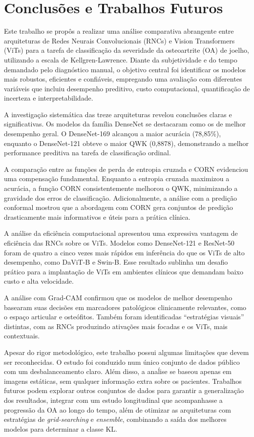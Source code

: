 \chapter{Conclusões e Trabalhos Futuros}\label{cap:conclusao}

Este trabalho se propôs a realizar uma análise comparativa abrangente entre arquiteturas de Redes Neurais Convolucionais (RNCs) e Vision Transformers (ViTs) para a tarefa de classificação da severidade da osteoartrite (OA) de joelho, utilizando a escala de Kellgren-Lawrence. Diante da subjetividade e do tempo demandado pelo diagnóstico manual, o objetivo central foi identificar os modelos mais robustos, eficientes e confiáveis, empregando uma avaliação com diferentes variáveis que incluiu desempenho preditivo, custo computacional, quantificação de incerteza e interpretabilidade.

A investigação sistemática das treze arquiteturas revelou conclusões claras e significativas. Os modelos da família DenseNet se destacaram como os de melhor desempenho geral. O DenseNet-169 alcançou a maior acurácia (78,85\%), enquanto o DenseNet-121 obteve o maior QWK (0,8878), demonstrando a melhor performance preditiva na tarefa de classificação ordinal.

A comparação entre as funções de perda de entropia cruzada e CORN evidenciou uma compensação fundamental. Enquanto a entropia cruzada maximizou a acurácia, a função CORN consistentemente melhorou o QWK, minimizando a gravidade dos erros de classificação. Adicionalmente, a análise com a predição conformal mostrou que a abordagem com CORN gera conjuntos de predição drasticamente mais informativos e úteis para a prática clínica.

A análise da eficiência computacional apresentou uma expressiva vantagem de eficiência das RNCs sobre os ViTs. Modelos como DenseNet-121 e ResNet-50 foram de quatro a cinco vezes mais rápidos em inferência do que os ViTs de alto desempenho, como DaViT-B e Swin-B. Esse resultado sublinha um desafio prático para a implantação de ViTs em ambientes clínicos que demandam baixo custo e alta velocidade.

A análise com Grad-CAM confirmou que os modelos de melhor desempenho basearam suas decisões em marcadores patológicos clinicamente relevantes, como o espaço articular e osteófitos. Também foram identificadas ``estratégias visuais'' distintas, com as RNCs produzindo ativações mais focadas e os ViTs, mais contextuais.

Apesar do rigor metodológico, este trabalho possui algumas limitações que devem ser reconhecidas. O estudo foi conduzido num único conjunto de dados público com um desbalanceamento claro. Além disso, a anaĺise se baseou apenas em imagens estáticas, sem qualquer informação extra sobre os pacientes. Trabalhos futuros podem explorar outros conjuntos de dados para garantir a generalização dos resultados, integrar com um estudo longitudinal que acompanhasse a progressão da OA ao longo do tempo, além de otimizar as arquiteturas com estratégias de \textit{grid-searching} e \textit{ensemble}, combinando a saída dos melhores modelos para determinar a classe KL.

